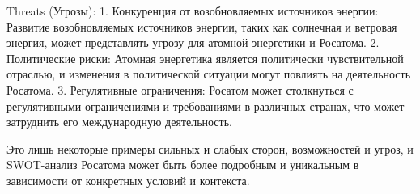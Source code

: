 Threats (Угрозы):
1. Конкуренция от возобновляемых источников энергии: Развитие возобновляемых источников энергии, таких как солнечная и ветровая энергия, может представлять угрозу для атомной энергетики и Росатома.
2. Политические риски: Атомная энергетика является политически чувствительной отраслью, и изменения в политической ситуации могут повлиять на деятельность Росатома.
3. Регулятивные ограничения: Росатом может столкнуться с регулятивными ограничениями и требованиями в различных странах, что может затруднить его международную деятельность.

Это лишь некоторые примеры сильных и слабых сторон, возможностей и угроз, и SWOT-анализ Росатома может быть более подробным и уникальным в зависимости от конкретных условий и контекста.

